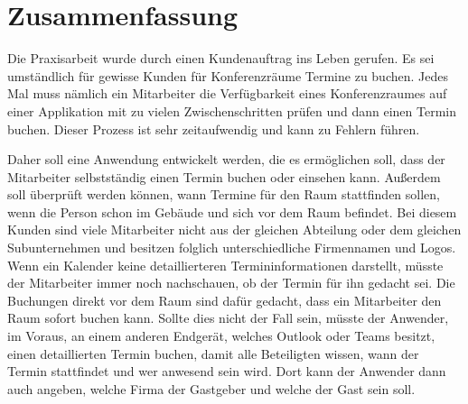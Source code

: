 \section*{Zusammenfassung}\label{sec:Zusammenfassung}
Die Praxisarbeit wurde durch einen Kundenauftrag ins Leben gerufen.
Es sei umständlich für gewisse Kunden für Konferenzräume Termine zu buchen.
Jedes Mal muss nämlich ein Mitarbeiter die Verfügbarkeit eines Konferenzraumes auf einer Applikation mit zu vielen Zwischenschritten prüfen und dann einen Termin buchen.
Dieser Prozess ist sehr zeitaufwendig und kann zu Fehlern führen.

\newline
\newline
Daher soll eine Anwendung entwickelt werden, die es ermöglichen soll, dass der Mitarbeiter selbstständig einen Termin buchen oder einsehen kann.
Außerdem soll überprüft werden können, wann Termine für den Raum stattfinden sollen, wenn die Person schon im Gebäude und sich vor dem Raum befindet.
\newline
Bei diesem Kunden sind viele Mitarbeiter nicht aus der gleichen Abteilung oder dem gleichen Subunternehmen und besitzen folglich unterschiedliche Firmennamen und Logos.
Wenn ein Kalender keine detaillierteren Termininformationen darstellt, müsste der Mitarbeiter immer noch nachschauen, ob der Termin für ihn gedacht sei.
Die Buchungen direkt vor dem Raum sind dafür gedacht, dass ein Mitarbeiter den Raum sofort buchen kann.
\newline
Sollte dies nicht der Fall sein, müsste der Anwender, im Voraus, an einem anderen Endgerät, welches Outlook oder Teams besitzt, einen detaillierten Termin buchen, damit alle Beteiligten wissen, wann der Termin stattfindet und wer anwesend sein wird.
Dort kann der Anwender dann auch angeben, welche Firma der Gastgeber und welche der Gast sein soll.
